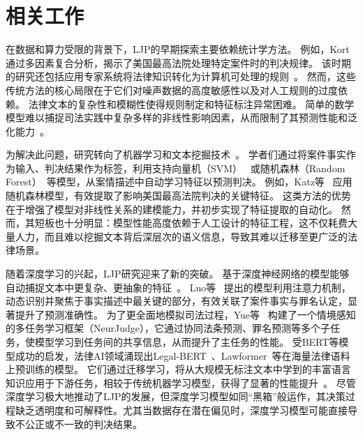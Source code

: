 \section{\heiti 相关工作}
在数据和算力受限的背景下，LJP的早期探索主要依赖统计学方法。
例如，Kort~\cite{kort1957predicting} 通过多因素复合分析，揭示了美国最高法院处理特定案件时的判决规律。
该时期的研究还包括应用专家系统将法律知识转化为计算机可处理的规则~\cite{susskind1986expert}。
然而，这些传统方法的核心局限在于它们对噪声数据的高度敏感性以及对人工规则的过度依赖。
法律文本的复杂性和模糊性使得规则制定和特征标注异常困难。
简单的数学模型难以捕捉司法实践中复杂多样的非线性影响因素，从而限制了其预测性能和泛化能力~\cite{deng2023syllogistic,dong2021legal}。


为解决此问题，研究转向了机器学习和文本挖掘技术~\cite{chen2013text,goncalves2005evaluating}。
学者们通过将案件事实作为输入、判决结果作为标签，利用支持向量机（SVM）~\cite{kianmehr2006crime} 或随机森林（Random Forest）~\cite{sulea2017exploring}等模型，从案情描述中自动学习特征以预测判决。
例如，Katz等~\cite{sulea2017exploring} 应用随机森林模型，有效提取了影响美国最高法院判决的关键特征。
这类方法的优势在于增强了模型对非线性关系的建模能力，并初步实现了特征提取的自动化。
然而，其短板也十分明显：模型性能高度依赖于人工设计的特征工程，这不仅耗费大量人力，而且难以挖掘文本背后深层次的语义信息，导致其难以迁移至更广泛的法律场景。


随着深度学习的兴起，LJP研究迎来了新的突破。
基于深度神经网络的模型能够自动捕捉文本中更复杂、更抽象的特征~\cite{cheng2025legal,feng2022legal,jiang2018interpretable,wang2019hierarchical}。
Luo等~\cite{huang2019improved} 提出的模型利用注意力机制，动态识别并聚焦于事实描述中最关键的部分，有效关联了案件事实与罪名认定，显著提升了预测准确性。
为了更全面地模拟司法过程，Yue等~\cite{yue2021neurjudge} 构建了一个情境感知的多任务学习框架（NeurJudge），它通过协同法条预测、罪名预测等多个子任务，使模型学习到任务间的共享信息，从而提升了主任务的性能。
受BERT等模型成功的启发，法律AI领域涌现出Legal-BERT~\cite{liu2021robustly,chalkidis2020legal,deepa2021bidirectional,devlin2019bert,fan2022multi}、Lawformer~\cite{xiao2021lawformer,du2022glm,fei2023lawbench,oana-maria2018e-snli}等在海量法律语料上预训练的模型。
它们通过迁移学习，将从大规模无标注文本中学到的丰富语言知识应用于下游任务，相较于传统机器学习模型，获得了显著的性能提升~\cite{cui2021pre,houlsby2019parameter,hu2018few,zhang2023contrastive}。
尽管深度学习极大地推动了LJP的发展，但深度学习模型如同“黑箱”般运作，其决策过程缺乏透明度和可解释性。尤其当数据存在潜在偏见时，深度学习模型可能直接导致不公正或不一致的判决结果。


